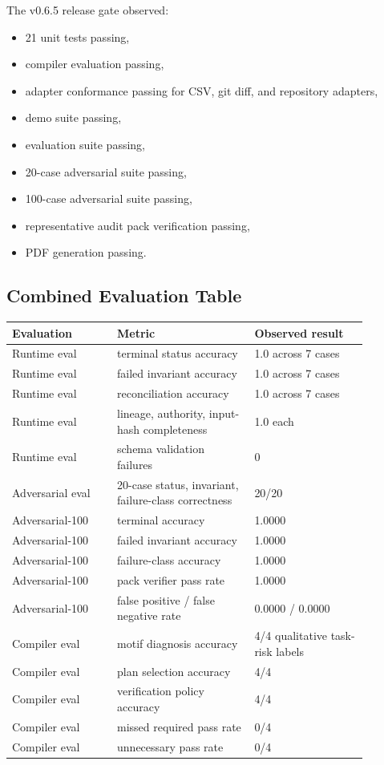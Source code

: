 \documentclass[11pt]{article}
\begin{document}
The v0.6.5 release gate observed:

\begin{itemize}[leftmargin=1.5em]
  \item 21 unit tests passing,
  \item compiler evaluation passing,
  \item adapter conformance passing for CSV, git diff, and repository adapters,
  \item demo suite passing,
  \item evaluation suite passing,
  \item 20-case adversarial suite passing,
  \item 100-case adversarial suite passing,
  \item representative audit pack verification passing,
  \item PDF generation passing.
\end{itemize}

\subsection{Combined Evaluation Table}

\begin{center}
\begin{tabular}{p{0.26\linewidth}p{0.34\linewidth}p{0.28\linewidth}}
\toprule
\textbf{Evaluation} & \textbf{Metric} & \textbf{Observed result} \\
\midrule
Runtime eval & terminal status accuracy & 1.0 across 7 cases \\
Runtime eval & failed invariant accuracy & 1.0 across 7 cases \\
Runtime eval & reconciliation accuracy & 1.0 across 7 cases \\
Runtime eval & lineage, authority, input-hash completeness & 1.0 each \\
Runtime eval & schema validation failures & 0 \\
\midrule
Adversarial eval & 20-case status, invariant, failure-class correctness & 20/20 \\
Adversarial-100 & terminal accuracy & 1.0000 \\
Adversarial-100 & failed invariant accuracy & 1.0000 \\
Adversarial-100 & failure-class accuracy & 1.0000 \\
Adversarial-100 & pack verifier pass rate & 1.0000 \\
Adversarial-100 & false positive / false negative rate & 0.0000 / 0.0000 \\
\midrule
Compiler eval & motif diagnosis accuracy & 4/4 qualitative task-risk labels \\
Compiler eval & plan selection accuracy & 4/4 \\
Compiler eval & verification policy accuracy & 4/4 \\
Compiler eval & missed required pass rate & 0/4 \\
Compiler eval & unnecessary pass rate & 0/4 \\
\bottomrule
\end{tabular}
\end{center}
\end{document}
